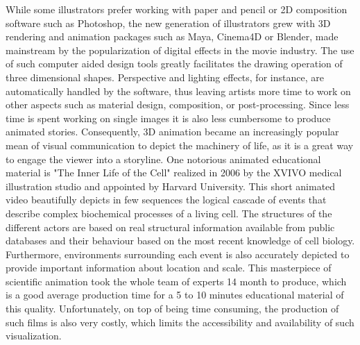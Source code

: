 While some illustrators prefer working with paper and pencil or 2D composition software such as Photoshop, the new generation of illustrators grew with 3D rendering and animation packages such as Maya, Cinema4D or Blender, made mainstream by the popularization of digital effects in the movie industry.
The use of such computer aided design tools greatly facilitates the drawing operation of three dimensional shapes.
Perspective and lighting effects, for instance, are automatically handled by the software, thus leaving artists more time to work on other aspects such as material design, composition, or post-processing.
Since less time is spent working on single images it is also less cumbersome to produce animated stories.
Consequently, 3D animation became an increasingly popular mean of visual communication to depict the machinery of life, as it is a great way to engage the viewer into a storyline.
One notorious animated educational material is "The Inner Life of the Cell" \cite{inner2006} realized in 2006 by the XVIVO medical illustration studio and appointed by Harvard University.
This short animated video beautifully depicts in few sequences the logical cascade of events that describe complex biochemical processes of a living cell.
The structures of the different actors are based on real structural information available from public databases and their behaviour based on the most recent knowledge of cell biology.
Furthermore, environments surrounding each event is also accurately depicted to provide important information about location and scale.
This masterpiece of scientific animation took the whole team of experts 14 month to produce, which is a good average production time for a 5 to 10 minutes educational material of this quality.
Unfortunately, on top of being time consuming, the production of such films is also very costly, which limits the accessibility and availability of such visualization.

